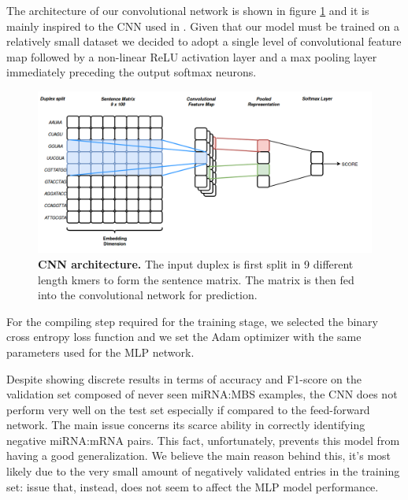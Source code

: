 The architecture of our convolutional network is shown in figure \ref{fig:cnn} and it is mainly inspired to the CNN used in \cite{cnn_arch}. Given that our model must be trained on a relatively small dataset we decided to adopt a single level of convolutional feature map followed by a non-linear ReLU activation layer and a max pooling layer immediately preceding the output softmax neurons. 

\begin{figure}[hbt!]
	\centering
	\includegraphics[width=\textwidth, height=0.4\textheight]{Figures/cnn_arch}
	\caption{\textbf{CNN architecture.} The input duplex is first split in 9 different length kmers to form the sentence matrix. The matrix is then fed into the convolutional network for prediction.}
	\label{fig:cnn}
\end{figure}     

For the compiling step required for the training stage, we selected the binary cross entropy loss function and we set the Adam optimizer with the same parameters used for the MLP network.

Despite showing discrete results in terms of accuracy and F1-score on the validation set composed of never seen miRNA:MBS examples, the CNN does not perform very well on the test set especially if compared to the feed-forward network. The main issue
concerns its scarce ability in correctly identifying negative miRNA:mRNA pairs. This fact, unfortunately, prevents this model from having a good generalization. We believe the main reason behind this, it's most likely due to the very small amount of negatively validated entries in the training set: issue that, instead, does not seem to affect the MLP model performance.

  

